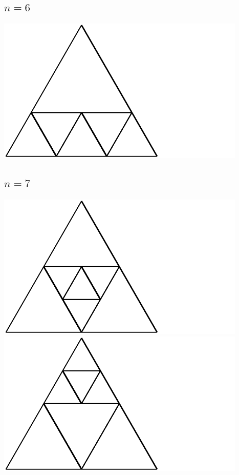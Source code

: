 \documentclass[12pt,amstags,fleqn]{article}
\theoremstyle{plain}
\theoremstyle{definition}
\begin{document}
\subsection*{$n = 6$}

\includegraphics{output-dissections-dissection6_i41_r1_c3.pdf}

\subsection*{$n = 7$}

\includegraphics{output-dissections-dissection7_i27_r3_c2.pdf}
\includegraphics{output-dissections-dissection7_i29_r1_c2.pdf}
\end{document}
